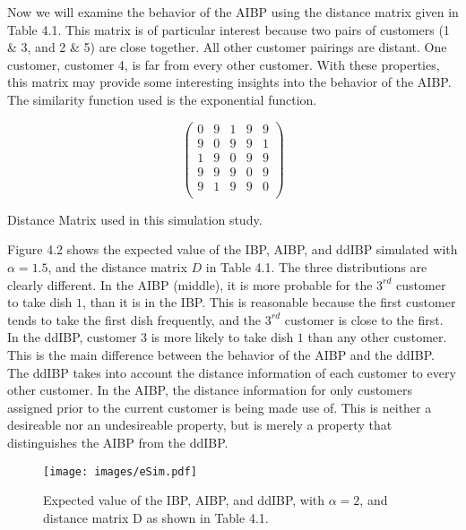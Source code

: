 \noindent
Now we will examine the behavior of the AIBP using the distance matrix given in 
Table 4.1. This matrix is of particular interest because two pairs of customers
(1 \& 3, and 2 \& 5) are close together. All other customer pairings are distant.
One customer, customer 4, is far from every other customer. With these properties,
this matrix may provide some interesting insights into the behavior of the AIBP.
The similarity function used is the exponential function.\\

\begin{table}[ht]
\centering
\[
  \begin{pmatrix}{}
    0 & 9 & 1 & 9 & 9 \\ 
    9 & 0 & 9 & 9 & 1 \\ 
    1 & 9 & 0 & 9 & 9 \\ 
    9 & 9 & 9 & 0 & 9 \\ 
    9 & 1 & 9 & 9 & 0 \\ 
  \end{pmatrix}
\]
\caption{Distance Matrix used in this simulation study.}
\end{table}


\noindent
Figure 4.2 shows the expected value of the IBP, AIBP, and ddIBP simulated with
$\alpha=1.5$, and the distance matrix $D$ in Table 4.1. The three distributions
are clearly different. In the AIBP (middle), it is more probable for the
$3^{rd}$ customer to take dish $1$, than it is in the IBP. This is reasonable
because the first customer tends to take the first dish frequently, and the
$3^{rd}$ customer is close to the first. In the ddIBP, customer $3$ is more
likely to take dish $1$ than any other customer. This is the main difference
between the behavior of the AIBP and the ddIBP. The ddIBP takes into account
the distance information of each customer to every other customer. In the AIBP,
the distance information for only customers assigned prior to the current
customer is being made use of. This is neither a  desireable nor an undesireable
property, but is merely a property that distinguishes the AIBP from the ddIBP.\\

\begin{figure}\begin{center}
  \texttt{[image: images/eSim.pdf]}
  \caption{Expected value of the IBP, AIBP, and ddIBP, with $\alpha=2$, and 
           distance matrix D as shown in Table 4.1. }
\end{center}\end{figure}

